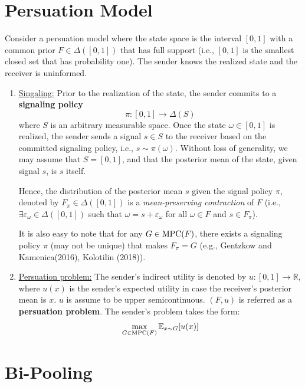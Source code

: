 \documentclass[11pt]{elegantbook}
\begin{document}
\section{Persuation Model}
Consider a persuation model where the state space is the interval $[0,1]$ with a common prior $F\in\Delta([0,1])$ that has full support (i.e., $[0,1]$ is the smallest closed set that has probability one). The sender knows the realized state and the receiver is uninformed.
\begin{enumerate}
    \item \underline{Singaling:} Prior to the realization of the state, the sender commits to a \textbf{signaling policy} $$\pi : [0, 1] \rightarrow \Delta(S)$$
    where $S$ is an arbitrary measurable space. Once the state $\omega\in[0,1]$ is realized, the sender sends a signal $s\in S$ to the receiver based on the committed signaling policy, i.e., $s \sim \pi(\omega)$. Without loss of generality, we may assume that $S=[0, 1]$, and that the posterior mean of the state, given signal $s$, is $s$ itself.
    
    Hence, the distribution of the posterior mean $s$ given the signal policy $\pi$, denoted by $F_\pi\in\Delta([0,1])$ is a \textit{mean-preserving contraction} of $F$ (i.e., $\exists \varepsilon_\omega\in\Delta([0,1])$ such that $\omega=s+\varepsilon_\omega$ for all $\omega\in F$ and $s\in F_\pi$).
    
    It is also easy to note that for any $G\in \textnormal{MPC}(F)$, there exists a signaling policy $\pi$ (may not be unique) that makes $F_\pi=G$ (e.g., Gentzkow and Kamenica(2016), Kolotilin (2018)).
    \item \underline{Persuation problem:} The sender's indirect utility is denoted by $u:[0,1] \rightarrow \mathbb{R}$, where $u(x)$ is the sender's expected utility in case the receiver's posterior mean is $x$. $u$ is assume to be upper semicontinuous. $(F,u)$ is referred as a \textbf{persuation problem}. The sender's problem takes the form:
    \begin{equation}
        \begin{aligned}
            \max_{G\in \textnormal{MPC}(F)}\mathbb{E}_{x\sim G}[u(x)]
        \end{aligned}
        \nonumber
    \end{equation}
\end{enumerate}


\section{Bi-Pooling}
\end{document}
